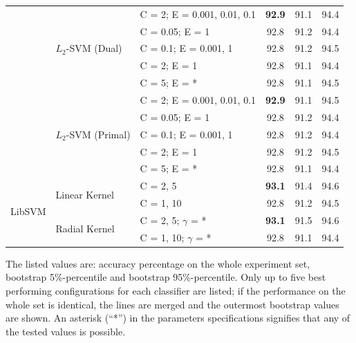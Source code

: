 \documentclass[12pt,notitlepage]{report}
\begin{document}
\begin{table}[htbp]
\begin{center}
\begin{tabular}{|l|l|l|c|c|c|}
 & \multirow{5}{*}{$L_2$-SVM (Dual)} & C = 2; E = 0.001, 0.01, 0.1 & \bf 92.9 & 91.1 & 94.4 \\
 &  & C = 0.05; E = 1 & 92.8 & 91.2 & 94.4 \\
 &  & C = 0.1; E = 0.001, 1 & 92.8 & 91.2 & 94.5 \\
 &  & C = 2; E = 1 & 92.8 & 91.1 & 94.4 \\
 & & C = 5; E = * & 92.8 & 91.1 & 94.5 \\\cline{2-6}
 & \multirow{5}{*}{$L_2$-SVM (Primal)} & C = 2; E = 0.001, 0.01, 0.1 & \bf 92.9 & 91.1 & 94.5 \\
 &  & C = 0.05; E = 1 & 92.8 & 91.2 & 94.4 \\
 &  & C = 0.1; E = 0.001, 1 & 92.8 & 91.2 & 94.4 \\
 &  & C = 2; E = 1 & 92.8 & 91.2 & 94.5 \\
 &  & C = 5; E = * & 92.8 & 91.1 & 94.4 \\\hline
 \multirow{4}{*}{LibSVM} & \multirow{2}{*}{Linear Kernel} & C = 2, 5 & \bf 93.1 & 91.4 & 94.6 \\
 &  & C = 1, 10 & 92.8 & 91.2 & 94.5 \\\cline{2-6}
 & \multirow{2}{*}{Radial Kernel} & C = 2, 5; $\gamma$ = * & \bf 93.1 & 91.5 & 94.6 \\
 &  & C = 1, 10; $\gamma$ = * & 92.8 & 91.1 & 94.4 \\\hline
\end{tabular}
\end{center}
The listed values are: accuracy percentage on the whole experiment set, bootstrap 5\%-percentile and bootstrap 95\%-percentile. Only up to five best performing configurations for each classifier are listed; if the performance on the whole set is identical, the lines are merged and the outermost bootstrap values are shown. An asterisk (``*'') in the parameters specifications signifies that any of the tested values is possible.
\end{table}
\end{document}
